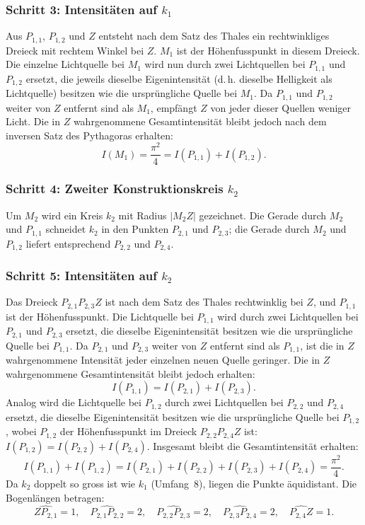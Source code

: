 \subsubsection{Schritt 3: Intensitäten auf $k_1$}
Aus $P_{1,1}$, $P_{1,2}$ und $Z$ entsteht nach dem Satz des Thales ein
rechtwinkliges Dreieck mit rechtem Winkel bei $Z$.
$M_1$ ist der Höhenfusspunkt in diesem Dreieck.
Die einzelne Lichtquelle bei $M_1$ wird nun durch zwei Lichtquellen
bei $P_{1,1}$ und $P_{1,2}$ ersetzt, die jeweils dieselbe Eigenintensität
(d.\,h. dieselbe Helligkeit als Lichtquelle) besitzen wie die ursprüngliche
Quelle bei $M_1$.
Da $P_{1,1}$ und $P_{1,2}$ weiter von $Z$ entfernt sind als $M_1$, empfängt $Z$
von jeder dieser Quellen weniger Licht. Die in $Z$ wahrgenommene Gesamtintensität
bleibt jedoch nach dem inversen Satz des Pythagoras erhalten:
\[
I(M_1) = \frac{\pi^2}{4} = I(P_{1,1}) + I(P_{1,2}).
\]

\subsubsection{Schritt 4: Zweiter Konstruktionskreis $k_2$}
Um $M_2$ wird ein Kreis $k_2$ mit Radius $|M_2 Z|$ gezeichnet.
Die Gerade durch $M_2$ und $P_{1,1}$ schneidet $k_2$ in den Punkten
$P_{2,1}$ und $P_{2,3}$; die Gerade durch $M_2$ und $P_{1,2}$ liefert
entsprechend $P_{2,2}$ und $P_{2,4}$.

\subsubsection{Schritt 5: Intensitäten auf $k_2$}
Das Dreieck $P_{2,1}P_{2,3}Z$ ist nach dem Satz des Thales rechtwinklig
bei $Z$, und $P_{1,1}$ ist der Höhenfusspunkt.
Die Lichtquelle bei $P_{1,1}$ wird durch zwei Lichtquellen bei $P_{2,1}$
und $P_{2,3}$ ersetzt, die dieselbe Eigenintensität besitzen wie die
ursprüngliche Quelle bei $P_{1,1}$.
Da $P_{2,1}$ und $P_{2,3}$ weiter von $Z$ entfernt sind als $P_{1,1}$,
ist die in $Z$ wahrgenommene Intensität jeder einzelnen neuen Quelle geringer.
Die in $Z$ wahrgenommene Gesamtintensität bleibt jedoch erhalten:
\[
I(P_{1,1}) = I(P_{2,1}) + I(P_{2,3}).
\]
Analog wird die Lichtquelle bei $P_{1,2}$ durch zwei Lichtquellen
bei $P_{2,2}$ und $P_{2,4}$ ersetzt, die dieselbe Eigenintensität besitzen
wie die ursprüngliche Quelle bei $P_{1,2}$, wobei $P_{1,2}$ der Höhenfusspunkt im
Dreieck $P_{2,2}P_{2,4}Z$ ist:
$I(P_{1,2}) = I(P_{2,2}) + I(P_{2,4})$.
Insgesamt bleibt die Gesamtintensität erhalten:
\[
I(P_{1,1}) + I(P_{1,2})
=
I(P_{2,1}) + I(P_{2,2}) + I(P_{2,3}) + I(P_{2,4})
=
\frac{\pi^2}{4}.
\]
Da $k_2$ doppelt so gross ist wie $k_1$ (Umfang~$8$), liegen die Punkte
äquidistant. Die Bogenlängen betragen:
\[
\widehat{ZP_{2,1}} = 1,\quad
\widehat{P_{2,1}P_{2,2}} = 2,\quad
\widehat{P_{2,2}P_{2,3}} = 2,\quad
\widehat{P_{2,3}P_{2,4}} = 2,\quad
\widehat{P_{2,4}Z} = 1.
\]

